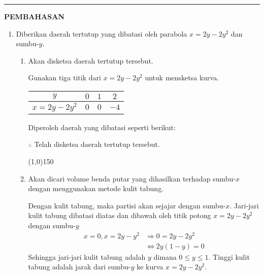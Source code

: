 \vspace{0.2cm}\hrule height 1pt\vspace{0.5cm}


\begin{center}
\textbf{\large{PEMBAHASAN}}
\end{center}
\begin{enumerate}[leftmargin=*, label={\arabic*}.]
\item Diberikan daerah tertutup yang dibatasi oleh parabola $x=2y-2y^{2}$ 
dan sumbu-$y$.
    \begin{enumerate}[label={\alph*}.]
        \item Akan disketsa daerah tertutup tersebut.
        
        Gunakan tiga titik dari $x=2y-2y^{2}$ untuk mensketsa kurva.
    \begin{center}
        \begin{tabular}{|c|c|c|c|}\hline
            $y$ & $0$ & $1$ & $2$ \\ \hline
            $x=2y-2y^{2}$ & $0$ & $0$ & $-4$ \\ \hline
        \end{tabular}
    \end{center}
    Diperoleh daerah yang dibatasi seperti berikut:

    

    $\therefore$ Telah disketsa daerah tertutup tersebut.


\begin{center}\line(1,0){150}\end{center}


    \item Akan dicari volume benda putar yang dihasilkan terhadap sumbu-$x$ 
    dengan menggunakan metode kulit tabung.

    Dengan kulit tabung, maka partisi akan sejajar dengan sumbu-$x$. Jari-jari 
    kulit tabung dibatasi diatas dan dibawah oleh titik potong $x=2y-2y^{2}$ dengan 
    sumbu-$y$
    \begin{align*}
        x=0, x=2y-y^{2} &\Longrightarrow 0 = 2y-2y^{2}\\
        &\iff 2y(1-y)=0
    \end{align*}
    Sehingga jari-jari kulit tabung adalah $y$ dimana $0 \leq y \leq 1$. Tinggi 
    kulit tabung adalah jarak dari sumbu-$y$ ke kurva $x=2y-2y^{2}$.


\end{enumerate}
\end{enumerate}
